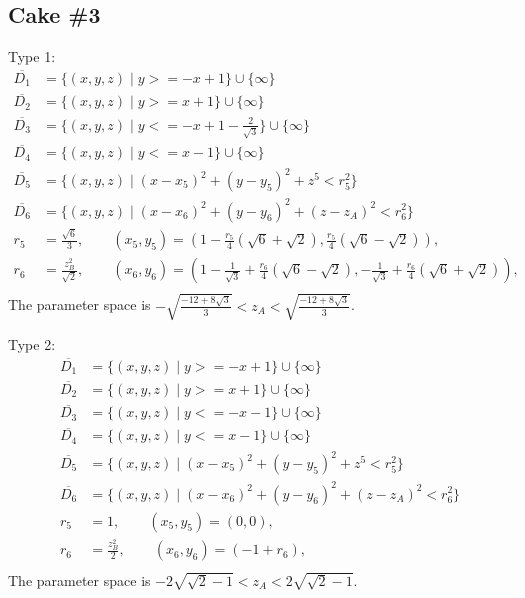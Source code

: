 \documentclass[suppldata, dvipdfmx]{interact}
\theoremstyle{plain}%
\theoremstyle{definition}
\theoremstyle{remark}
\theoremstyle{problemstyle}
\begin{document}
\subsection{Cake \#3}
Type 1:
\begin{align*}
\overline{D_1}&= \{ (x,y,z) \mid y >= -x + 1 \} \cup \{ \infty \}\\
\overline{D_2}&= \{ (x,y,z) \mid y >= x + 1 \} \cup \{ \infty \}\\
\overline{D_3}&= \{ (x,y,z) \mid y <= -x + 1 - \frac{2}{\sqrt{3}}  \} \cup \{ \infty \}\\
\overline{D_4}&= \{ (x,y,z) \mid y <= x -1 \} \cup \{ \infty \}\\
\overline{D_5}&=\{(x,y,z) \mid (x-x_5)^2+(y-y_5)^2+z^5<r_5^2 \} \\
\overline{D_6}&=\{(x,y,z) \mid (x-x_6)^2+(y-y_6)^2+(z-z_A)^2<r_6^2 \} \\
r_5 &= \frac{\sqrt{6}}{3}, \qquad
(x_5, y_5) = \left(1 - \frac{r_5}{4}(\sqrt{6} + \sqrt{2}), \frac{r_5}{4}(\sqrt{6} - \sqrt{2})\right), \\
r_6 &= \frac{z_B^2}{\sqrt{2}}, \qquad
(x_6, y_6) = \left(1 -\frac{1}{\sqrt{3}} + \frac{r_6}{4}(\sqrt{6} - \sqrt{2}), -\frac{1}{\sqrt{3}} + \frac{r_6}{4}(\sqrt{6} + \sqrt{2})\right), \\
\end{align*}
The parameter space is $-\sqrt{\frac{-12 + 8 \sqrt{3}}{3}} < z_A < \sqrt{\frac{-12 + 8 \sqrt{3}}{3}}$.
\bigskip\par
Type 2:
\begin{align*}
\overline{D_1}&= \{ (x,y,z) \mid y >= -x + 1 \} \cup \{ \infty \}\\
\overline{D_2}&= \{ (x,y,z) \mid y >= x + 1 \} \cup \{ \infty \}\\
\overline{D_3}&= \{ (x,y,z) \mid y <= -x -1 \} \cup \{ \infty \}\\
\overline{D_4}&= \{ (x,y,z) \mid y <= x - 1 \} \cup \{ \infty \}\\
\overline{D_5}&=\{(x,y,z) \mid (x-x_5)^2+(y-y_5)^2+z^5<r_5^2 \} \\
\overline{D_6}&=\{(x,y,z) \mid (x-x_6)^2+(y-y_6)^2+(z-z_A)^2<r_6^2 \} \\
r_5 &= 1, \qquad
(x_5, y_5) = \left(0, 0\right), \\
r_6 &= \frac{z_B^2}{2}, \qquad
(x_6, y_6) = \left(-1 + r_6\right), \\
\end{align*}
The parameter space is $-2\sqrt{\sqrt{2} - 1} < z_A < 2\sqrt{\sqrt{2} -1}$.
\end{document}
